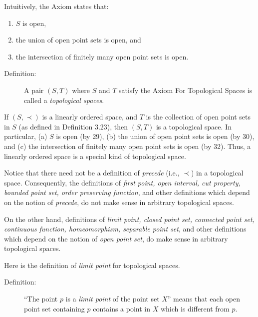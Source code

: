 \documentclass{book}
\begin{document}
Intuitively, the Axiom states that: 
\begin{enumerate}[\hspace{1cm}(a)]
  \item $S$ is open, 
  \item the union of open point sets is open, and 
  \item the intersection of finitely many open point sets is open.
\end{enumerate}

\begin{description}

\item[Definition:] A pair $(S,T)$ where $S$ and $T$ satisfy the Axiom For Topological Spaces is called a \emph{topological spaces}.

\end{description}

If $(S, \prec)$ is a linearly ordered space, and $T$ is the collection of open point sets in $S$ (as defined in Definition 3.23), then $(S,T)$ is a topological space. In particular, (a) $S$ is open (by 29), (b) the union of open point sets is open (by 30), and (c) the intersection of finitely many open point sets is open (by 32). Thus, a linearly ordered space is a special kind of topological space.

Notice that there need not be a definition of \emph{precede} (i.e., $\prec$) in a topological space. Consequently, the definitions of \emph{first point, open interval, cut property, bounded point set, order preserving function}, and other definitions which depend on the notion of \emph{precede}, do not make sense in arbitrary topological spaces. 

On the other hand, definitions of \emph{limit point, closed point set, connected point set, continuous function, homeomorphism, separable point set}, and other definitions which depend on the notion of \emph{open point set}, do make sense in arbitrary topological spaces.

Here is the definition of \emph{limit point} for topological spaces.

\begin{description}

\item[Definition:] ``The point $p$ is a \emph{limit point} of the point set $X$'' means that each open point set containing $p$ contains a point in $X$ which is different from $p$.

\end{description}
\end{document}
